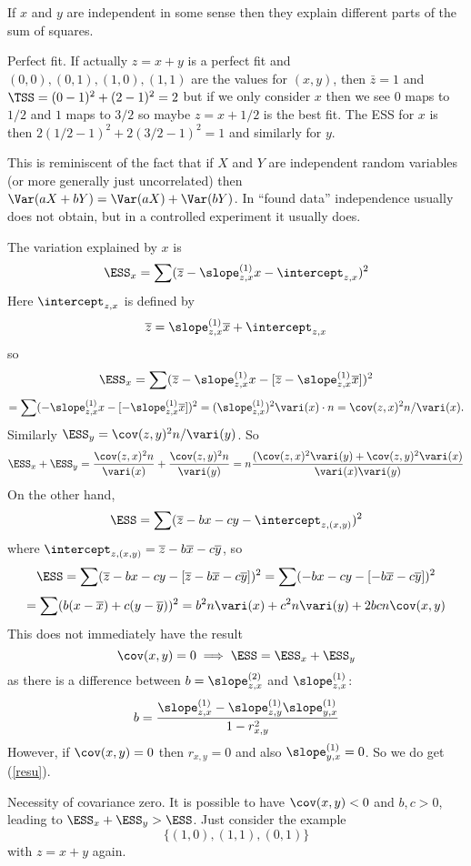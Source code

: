 If $x$ and $y$ are independent in some sense then they explain different parts of the sum of squares.
\begin{example}{Perfect fit.}
If actually $z=x+y$ is a perfect fit and $(0,0), (0,1), (1,0), (1,1)$ are the values for $(x,y)$, then $\bar z = 1$ and $\TSS = (0-1)^2+(2-1)^2 = 2$
but if we only consider $x$ then we see $0$ maps to $1/2$ and $1$ maps to $3/2$ so maybe $z=x+1/2$ is the best fit.
The ESS for $x$ is then $2 (1/2-1)^2 + 2(3/2-1)^2 = 1$ and similarly for $y$.
\end{example}

This is reminiscent of the fact that if $X$ and $Y$ are independent random variables (or more generally just uncorrelated) then $\Var(aX+bY)=\Var(aX)+\Var(bY)$. In ``found data'' independence usually does not obtain, but in a controlled experiment it usually does.


The variation explained by $x$ is
\[
	\ESS_x = \sum (\overline z - \slope^{(1)}_{z,x}x-\intercept_{z,x})^2
\]
Here $\intercept_{z,x}$ is defined by
\[
	\overline z = \slope^{(1)}_{z,x}\overline x + \intercept_{z,x}
\]
so
\[
	\ESS_x = \sum (\overline z - \slope^{(1)}_{z,x}x- [\overline z - \slope^{(1)}_{z,x}\overline x]  )^2
\]
\[
	= \sum ( - \slope^{(1)}_{z,x}x- [ - \slope^{(1)}_{z,x}\overline x]  )^2 = (\slope^{(1)}_{z,x})^2 \vari(x)\cdot n = \cov(z,x)^2n/\vari(x).
\]
Similarly $\ESS_y = \cov(z,y)^2n/\vari(y)$.
So
\[
\ESS_x+\ESS_y = \frac{\cov(z,x)^2n}{\vari(x)} + \frac{\cov(z,y)^2n}{\vari(y)} = n \frac{(\cov(z,x)^2\vari(y)+\cov(z,y)^2\vari(x)}{\vari(x)\vari(y)}
\]
On the other hand,
\[
	\ESS = \sum (\overline z - bx-cy -\intercept_{z,(x,y)})^2
\]
where $\intercept_{z,(x,y)}=\overline z - b\overline x-c\overline y$, so
\[
	\ESS = \sum (\overline z - bx-cy -[\overline z - b\overline x-c\overline y])^2 = \sum (- bx-cy -[ - b\overline x-c\overline y])^2
\]
\[
	= \sum (b(x-\overline x)+c(y-\overline y))^2 = b^2 n\vari(x) + c^2n\vari(y) + 2bcn\cov(x,y)
\]
This does not immediately have the result
\begin{equation}\label{resu}
\cov(x,y)=0 \implies \ESS=\ESS_x+\ESS_y
\end{equation}
as there is a difference between $b=\slope^{(2)}_{z,x}$ and $\slope^{(1)}_{z,x}$:
\[
	b = \frac{\slope^{(1)}_{z,x} - \slope^{(1)}_{z,y} \slope^{(1)}_{y,x}}{1-r^2_{x,y}}
\]
However, if $\cov(x,y)=0$ then $r_{x,y}=0$ and also $\slope^{(1)}_{y,x}=0$. So we do get (\ref{resu}).

\begin{example}{Necessity of covariance zero.}
It is possible to have $\cov(x,y)<0$ and $b,c>0$, leading to $\ESS_x+\ESS_y>\ESS$. Just consider the example
\[
	\{(1,0),(1,1),(0,1)\}
\]
with $z=x+y$ again.
\end{example}

